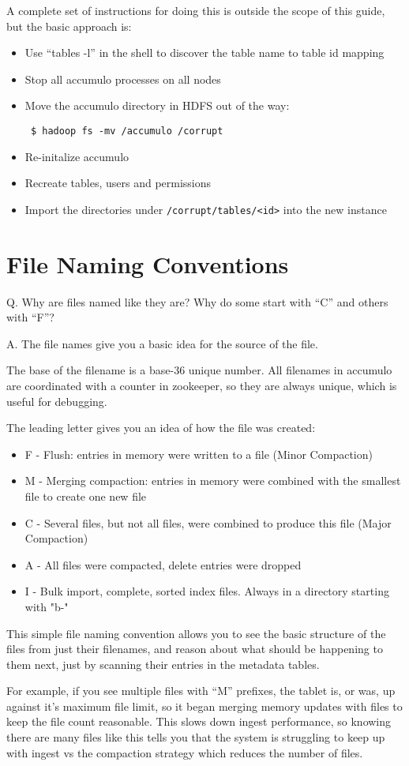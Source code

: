 A complete set of instructions for doing this is outside the scope of this guide,
but the basic approach is:

\begin{itemize}
 \item Use ``tables -l'' in the shell to discover the table name to table id mapping
 \item Stop all accumulo processes on all nodes
 \item Move the accumulo directory in HDFS out of the way:
\small
\begin{verbatim}
 $ hadoop fs -mv /accumulo /corrupt
\end{verbatim}
\normalsize
 \item Re-initalize accumulo
 \item Recreate tables, users and permissions
 \item Import the directories under \texttt{/corrupt/tables/<id>} into the new instance
\end{itemize}

\section{File Naming Conventions}

Q. Why are files named like they are? Why do some start with ``C'' and others with ``F''?

A. The file names give you a basic idea for the source of the file.

The base of the filename is a base-36 unique number. All filenames in accumulo are coordinated 
with a counter in zookeeper, so they are always unique, which is useful for debugging.

The leading letter gives you an idea of how the file was created:

\begin{itemize}
 \item F - Flush: entries in memory were written to a file (Minor Compaction)
 \item M - Merging compaction: entries in memory were combined with the smallest file to create one new file
 \item C - Several files, but not all files, were combined to produce this file (Major Compaction)
 \item A - All files were compacted, delete entries were dropped
 \item I - Bulk import, complete, sorted index files. Always in a directory starting with "b-"
\end{itemize}

This simple file naming convention allows you to see the basic structure of the files from just 
their filenames, and reason about what should be happening to them next, just
by scanning their entries in the metadata tables.

For example, if you see multiple files with ``M'' prefixes, the tablet is, or was, up against it's
maximum file limit, so it began merging memory updates with files to keep the file count reasonable.  This
slows down ingest performance, so knowing there are many files like this tells you that the system
is struggling to keep up with ingest vs the compaction strategy which reduces the number of files.

